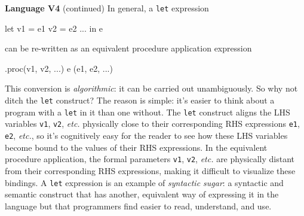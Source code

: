 \begin{minipage}[t]{\sw}
\slidenumber
\LARGE
{\bf Language V4} (continued)\exx
In general, a \verb'let' expression
{\Large
\begin{qv}
let
  v1 = e1
  v2 = e2
  ...
in
  e
\end{qv}
}
can be re-written as an equivalent procedure application expression
{\Large
\begin{qv}
.proc(v1, v2, ...) e (e1, e2, ...)
\end{qv}
}
This conversion is {\em algorithmic}:
it can be carried out unambiguously.
So why not ditch the \verb'let' construct?
The reason is simple:
it's easier to think about a program with a \verb'let' in it
than one without.
The \verb'let' construct aligns
the LHS variables \verb'v1', \verb'v2', {\em etc.}
physically close to their corresponding RHS expressions
\verb'e1', \verb'e2', {\em etc.},
so it's cognitively easy for the reader
to see how these LHS variables become bound
to the values of their RHS expressions.
In the equivalent procedure application,
the formal parameters \verb'v1', \verb'v2', {\em etc.}
are physically distant from their corresponding RHS expressions,
making it difficult to visualize these bindings.
A \verb'let' expression is an example of {\em syntactic sugar}:
a syntactic and semantic construct
that has another, equivalent way of expressing it in the language
but that programmers find easier to read, understand, and use.
\end{minipage}
\clearpage
